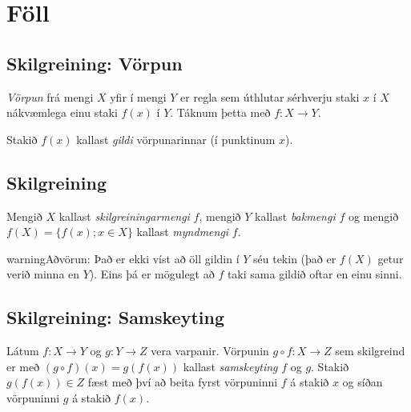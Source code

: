 \documentclass[a4paper,10pt,icelandic]{sphinxmanual}
\begin{document}
\section{Föll}
\label{kafli01:foll}

\subsection{Skilgreining: Vörpun}
\label{kafli01:skilgreining-vorpun}\label{kafli01:index-3}
\textit{Vörpun} frá mengi \(X\) yfir í mengi \(Y\) er
regla sem úthlutar sérhverju staki \(x\) í \(X\) nákvæmlega einu
staki \(f(x)\) í \(Y\). Táknum þetta með \(f:X \to Y\).

Stakið \(f(x)\) kallast \textit{gildi} vörpunarinnar (í punktinum
\(x\)).


\subsection{Skilgreining}
\label{kafli01:skilgreining}\label{kafli01:index-4}
Mengið \(X\) kallast \textit{skilgreiningarmengi}
\(f\), mengið \(Y\) kallast \textit{bakmengi}
\(f\) og mengið
\(f(X) = \{ f(x); x \in X \}\) kallast \textit{myndmengi} \(f\).


\begin{notice}{warning}{Aðvörun:}
Það er ekki víst að öll gildin í \(Y\) séu tekin
(það er \(f(X)\) getur verið minna en \(Y\)). Eins þá er mögulegt
að \(f\) taki sama gildið oftar en einu sinni.
\end{notice}


\subsection{Skilgreining: Samskeyting}
\label{kafli01:skilgreining-samskeyting}\label{kafli01:index-5}\label{kafli01:samskeyting}
Látum \(f:X \to Y\) og \(g:Y \to Z\) vera
varpanir. Vörpunin \(g\circ f:X \to Z\) sem skilgreind er með
\((g\circ f)(x)=g(f(x))\) kallast \textit{samskeyting} \(f\) og
\(g\). Stakið \(g(f(x)) \in Z\) fæst með því að beita fyrst
vörpuninni \(f\) á stakið \(x\) og síðan vörpuninni \(g\) á
stakið \(f(x)\).
\end{document}
